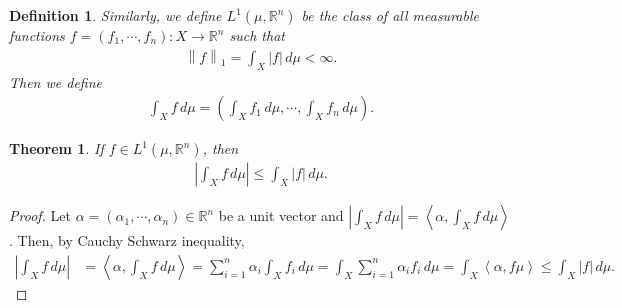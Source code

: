 \documentclass[11pt]{book}
\newtheorem{definition}{Definition}[chapter]
\newtheorem{theorem}{Theorem}[chapter]
\theoremstyle{definition}
\numberwithin{equation}{chapter}
\begin{document}
\medskip

\begin{definition}
Similarly, we define $L^1(\mu,\mathbb{R}^n)$ be the class of all measurable functions $f = (f_1,\cdots,f_n): X \to \mathbb{R}^n$ such that
\begin{align*}
    \left\|f\right\|_1 = \int_X \left|f\right|\,d\mu < \infty.
\end{align*}
Then we define 
\begin{align*}
    \int_X f\,d\mu = \left(\int_X f_1\,d\mu,\cdots,\int_X f_n\,d\mu\right).
\end{align*}
\end{definition}

\medskip

\begin{theorem}\label{theorem_215}
If $f \in L^1(\mu,\mathbb{R}^n)$, then
\begin{align*}
    \left|\int_X f\,d\mu\right| \leq \int_X \left|f\right|\,d\mu.
\end{align*}
\end{theorem}
\begin{proof}
Let $\alpha = (\alpha_1,\cdots,\alpha_n) \in \mathbb{R}^n$ be a unit vector and $\left|\int_X f\,d\mu\right| = \left\langle \alpha,\int_X f\,d\mu \right\rangle$. Then, by Cauchy Schwarz inequality,
\begin{align*}
    \left|\int_X f\,d\mu\right| & = \left\langle \alpha,\int_X f\,d\mu \right\rangle = \sum^n_{i=1} \alpha_i \int_X f_i\,d\mu = \int_X \sum^n_{i=1} \alpha_i f_i\,d\mu = \int_X \left\langle \alpha,f\mu \right\rangle \leq \int_X \left|f\right|\,d\mu.
\end{align*}
\end{proof}

\medskip
\end{document}

